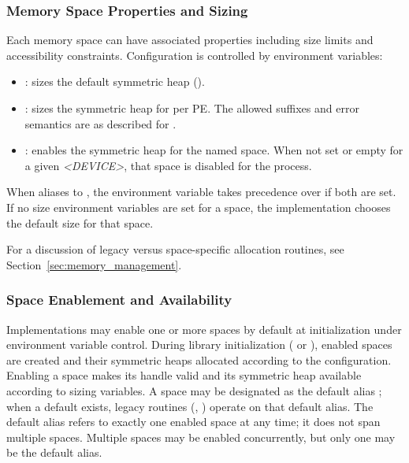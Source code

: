 \subsubsection*{Memory Space Properties and Sizing}

Each memory space can have associated properties including size limits and
accessibility constraints. Configuration is controlled by environment variables:

\begin{itemize}
  \item {}: sizes the default symmetric heap
    ().
  \item {}: sizes the symmetric heap
    for  per \ac{PE}. The allowed suffixes
    and error semantics are as described for .
  \item {}: enables the symmetric heap for the
    named space. When not set or empty for a given \textit{<DEVICE>}, that
    space is disabled for the process.
\end{itemize}

When  aliases to
, the
 environment variable takes
precedence over  if both are set. If no size
environment variables are set for a space, the implementation chooses the
default size for that space.

For a discussion of legacy versus space-specific allocation routines, see
Section~\ref{sec:memory_management}.

\subsubsection*{Space Enablement and Availability}

Implementations may enable one or more spaces by default at initialization
under environment variable control. During library initialization
( or ), enabled spaces are created
and their symmetric heaps allocated according to the configuration. Enabling a
space makes its handle valid and its symmetric heap available according to
sizing variables. A space may be
designated as the default alias ; when a
default exists, legacy routines (, )
operate on that default alias.
The default alias refers to exactly one enabled space at any time; it does not
span multiple spaces. Multiple spaces may be enabled concurrently, but only one
may be the default alias.

